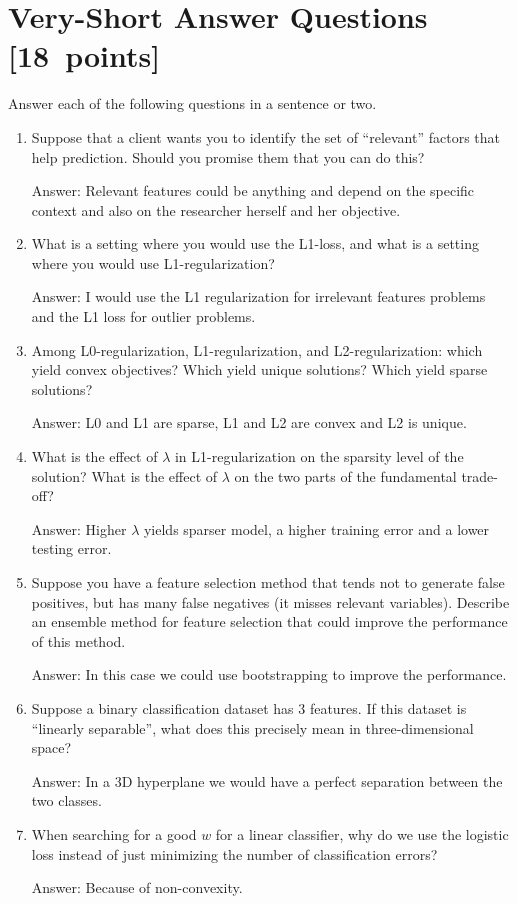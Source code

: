 \documentclass{article}
\newcommand{\blu}[1]{{\textcolor{blu}{#1}}}
\newenvironment{answer}{\par\begingroup\color{gre}Answer: }{\endgroup}
\let\ask\blu
\newcommand\pts[1]{\textcolor{pointscolour}{[#1~points]}}
\begin{document}
\clearpage
\section{Very-Short Answer Questions \pts{18}}

\ask{Answer each of the following questions in a sentence or two.}
\begin{enumerate}

\item Suppose that a client wants you to identify the set of ``relevant'' factors that help prediction. Should you promise them that you can do this?
\begin{answer}
    Relevant features could be anything and depend on the specific context and also on the researcher herself and her objective.
\end{answer}

\item What is a setting where you would use the L1-loss, and what is a setting where you would use L1-regularization?
\begin{answer}
    I would use the L1 regularization for irrelevant features problems and the L1 loss for outlier problems.
\end{answer}
\item Among L0-regularization, L1-regularization, and L2-regularization: which yield convex objectives? Which yield unique solutions? Which yield sparse solutions?
\begin{answer}
    L0 and L1 are sparse, L1 and L2 are convex and L2 is unique.
\end{answer}
\item What is the effect of $\lambda$ in L1-regularization on the sparsity level of the solution? What is the effect of $\lambda$ on the two parts of the fundamental trade-off?
\begin{answer}
    Higher $\lambda$ yields sparser model, a higher training error and a lower testing error. 
\end{answer}
\item Suppose you have a feature selection method that tends not to generate false positives, but has many false negatives (it misses relevant variables). Describe an ensemble method for feature selection that could improve the performance of this method.
\begin{answer}
    In this case we could use bootstrapping to improve the performance.
\end{answer}
\item Suppose a binary classification dataset has 3 features. If this dataset is ``linearly separable'', what does this precisely mean in three-dimensional space?
\begin{answer}
    In a 3D hyperplane we would have a perfect separation between the two classes. 
\end{answer}
\item When searching for a good $w$ for a linear classifier, why do we use the logistic loss instead of just minimizing the number of classification errors?
\begin{answer}
    Because of non-convexity.
\end{answer}


\end{enumerate}
\end{document}
